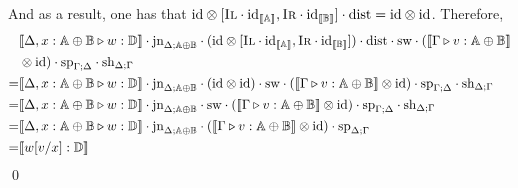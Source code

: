 And as a result, one has that $\text{id} \otimes [\textsc{Il} \cdot \text{id}_{\llbracket\mathbb{A}\rrbracket}, \textsc{Ir} \cdot \text{id}_{\llbracket\mathbb{B}\rrbracket}] \cdot \text{dist} = \text{id} \otimes \text{id}$. Therefore,
\begin{equation*}
  \begin{split}
    & \llbracket\Delta, x: \mathbb{A} \oplus \mathbb{B} \triangleright w: \mathbb{D}\rrbracket \cdot \text{jn}_{\Delta;\mathbb{A} \oplus \mathbb{B}} \cdot (\text{id} \otimes [\textsc{Il} \cdot \text{id}_{\llbracket\mathbb{A}\rrbracket},\textsc{Ir} \cdot \text{id}_{\llbracket\mathbb{B}\rrbracket}]) \cdot \text{dist} \cdot \text{sw}  \cdot (\llbracket\Gamma \triangleright v: \mathbb{A} \oplus \mathbb{B}\rrbracket  \\
    & \otimes \text{id})  \cdot  \text{sp}_{\Gamma;\Delta} \cdot \text{sh}_{\Delta;\Gamma} \\
  = & \llbracket\Delta, x: \mathbb{A} \oplus \mathbb{B} \triangleright w: \mathbb{D}\rrbracket \cdot \text{jn}_{\Delta;\mathbb{A} \oplus \mathbb{B}} \cdot (\text{id} \otimes \text{id})  \cdot \text{sw} \cdot (\llbracket\Gamma \triangleright v: \mathbb{A} \oplus \mathbb{B}\rrbracket \otimes \text{id}) \cdot \text{sp}_{\Gamma;\Delta} \cdot \text{sh}_{\Delta;\Gamma}\\
  = & \llbracket\Delta, x: \mathbb{A} \oplus \mathbb{B} \triangleright w: \mathbb{D}\rrbracket \cdot \text{jn}_{\Delta;\mathbb{A} \oplus \mathbb{B}}  \cdot  \text{sw} \cdot (\llbracket\Gamma \triangleright v: \mathbb{A} \oplus \mathbb{B}\rrbracket \otimes \text{id}) \cdot \text{sp}_{\Gamma;\Delta} \cdot \text{sh}_{\Delta;\Gamma}\\
  = & \llbracket\Delta, x: \mathbb{A} \oplus \mathbb{B} \triangleright w: \mathbb{D}\rrbracket \cdot \text{jn}_{\Delta;\mathbb{A} \oplus \mathbb{B}}  \cdot   (\llbracket\Gamma \triangleright v: \mathbb{A} \oplus \mathbb{B}\rrbracket \otimes \text{id}) \cdot \text{sp}_{\Delta;\Gamma} \\
  = & \llbracket w[v/x] : \mathbb{D} \rrbracket
\end{split}
\end{equation*}
\qed

